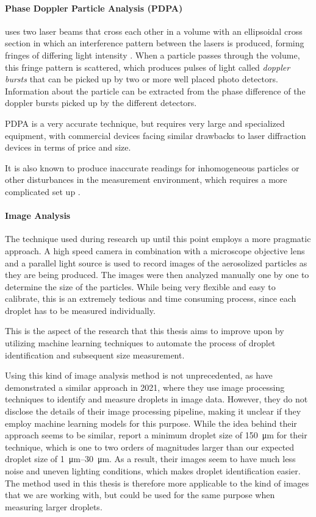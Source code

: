 \paragraph{Phase Doppler Particle Analysis (PDPA)} uses two laser beams that cross each other in a volume with an ellipsoidal cross section in which an interference pattern between the lasers is produced, forming fringes of differing light intensity \cite{hollPARTICLEDEPOSITIONVELOCITIES}.
When a particle passes through the volume, this fringe pattern is scattered, which produces pulses of light called \emph{doppler bursts} that can be picked up by two or more well placed photo detectors.
Information about the particle can be extracted from the phase difference of the doppler bursts picked up by the different detectors.

PDPA is a very accurate technique, but requires very large and specialized equipment, with commercial devices facing similar drawbacks to laser diffraction devices in terms of price and size.

It is also known to produce inaccurate readings for inhomogeneous particles or other disturbances in the measurement environment, which requires a more complicated set up \cite{sijsDropSizeMeasurement2021}.

\paragraph{Image Analysis} 
The technique used during research up until this point employs a more pragmatic approach. A high speed camera in combination with a microscope objective lens and a parallel light source is used to record images of the aerosolized particles as they are being produced. The images were then analyzed manually one by one to determine the size of the particles. While being very flexible and easy to calibrate, this is an extremely tedious and time consuming process, since each droplet has to be measured individually.

This is the aspect of the research that this thesis aims to improve upon by utilizing machine learning techniques to automate the process of droplet identification and subsequent size measurement.

Using this kind of image analysis method is not unprecedented, as \cite{sijsDropSizeMeasurement2021} have demonstrated a similar approach in 2021, where they use image processing techniques to identify and measure droplets in image data. 
However, they do not disclose the details of their image processing pipeline, making it unclear if they employ machine learning models for this purpose.
While the idea behind their approach seems to be similar,  report a minimum droplet size of \SI{150}{\micro\meter} for their technique, which is one to two orders of magnitudes larger than our expected droplet size of \SIrange{1}{30}{\micro\meter}.
As a result, their images seem to have much less noise and uneven lighting conditions, which makes droplet identification easier.
The method used in this thesis is therefore more applicable to the kind of images that we are working with, but could be used for the same purpose when measuring larger droplets.


